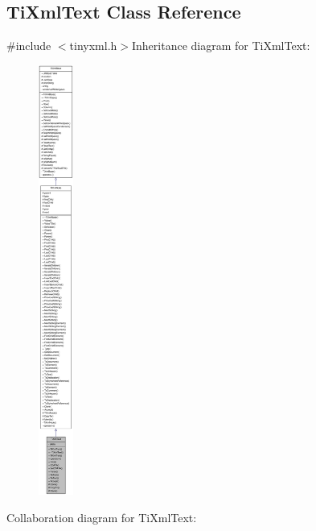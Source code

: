 \hypertarget{class_ti_xml_text}{
\subsection{TiXmlText Class Reference}
\label{class_ti_xml_text}
}


{\ttfamily \#include $<$tinyxml.h$>$}Inheritance diagram for TiXmlText:\nopagebreak
\begin{figure}[H]
\begin{center}
\leavevmode
\includegraphics[height=400pt]{class_ti_xml_text__inherit__graph}
\end{center}
\end{figure}
Collaboration diagram for TiXmlText:\nopagebreak

